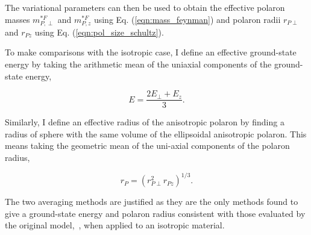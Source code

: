 The variational parameters can then be used to obtain the effective polaron masses $m^{*F}_{P,\perp}$ and $m^{*F}_{P, z}$ using Eq. (\ref{eqn:mass_feynman}) and polaron radii $r_{P\perp}$ and $r_{Pz}$ using Eq. (\ref{eqn:pol_size_schultz}). 

To make comparisons with the isotropic case, I define an effective ground-state energy by taking the arithmetic mean of the uniaxial components of the ground-state energy,

\begin{equation}
    E = \frac{2 E_\perp + E_z}{3}.
\end{equation}

Similarly, I define an effective radius of the anisotropic polaron by finding a radius of sphere with the same volume of the ellipsoidal anisotropic polaron. This means taking the geometric mean of the uni-axial components of the polaron radius, 

\begin{equation}
    r_P = \left(r^2_{P\perp} r_{Pz}\right)^{1/3}.
\end{equation}

The two averaging methods are justified as they are the only methods found to give a ground-state energy and polaron radius consistent with those evaluated by the original model,~\cite{feynman_slow_1955}, when applied to an isotropic material.